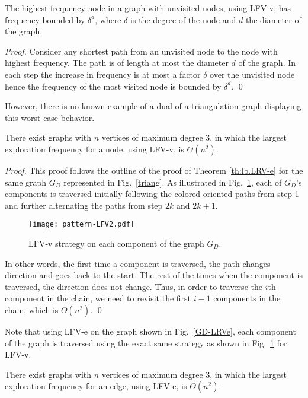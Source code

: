 \begin{theorem}\label{thm:LFVv-delta-d}
The highest frequency node in a graph with unvisited nodes, using LFV-v, has frequency
bounded by $\delta^d$, where $\delta$ is the degree of the node and $d$ the
diameter of the graph.
\end{theorem}
\begin{proof}
Consider any shortest path from an unvisited node to the node with highest frequency.
The path is of length at most the diameter $d$ of the graph. In each step
the increase in frequency is at most a factor $\delta$ over the unvisited node
hence the frequency of the most visited node is bounded by $\delta^d$.
\qed
\end{proof}
However, there is no known example of a dual of a triangulation graph
displaying this worst-case behavior.
\begin{theorem}\label{LFVv-lb}
There exist graphs with $n$ vertices of maximum degree 3, in which the largest
exploration frequency for a node, using LFV-v, is $\Theta(n^2).$
\end{theorem}
\begin{proof}
This proof follows the outline of the proof of Theorem \ref{th:lb.LRV-e}
for the same graph $G_D$ represented in Fig.~\ref{triang}.
As illustrated in Fig.~\ref{LFVv}, each of $G_D$'s components is traversed
initially following the colored oriented paths from step 1 and further
alternating the paths from step $2k$ and $2k+1$.


\begin{figure}[h]\centering
 \texttt{[image: pattern-LFV2.pdf]}
\caption{LFV-v strategy on each component of the graph $G_D$.} \label{LFVv}
 \end{figure}
In other words, the first time a component is traversed, the path
changes direction and goes back to the start. The rest of the times
when the component is traversed, the direction does not change. Thus, in order to traverse the $i$th component in the chain, we need
to revisit the first $i-1$ components in the chain, which is $\Theta(n^2)$.
\qed
\end{proof}

Note that using LFV-e on the graph shown in Fig.~\ref{GD-LRVe}, each component of the graph is traversed using the exact same
strategy as shown in Fig.~\ref{LFVv} for LFV-v.\begin{theorem}\label{LFVe-lb}
There exist graphs with $n$ vertices of maximum degree 3, in which
the largest exploration frequency for an edge, using LFV-e, is $\Theta(n^2)$.
\end{theorem}


